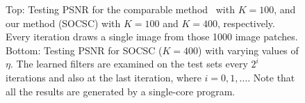 \begin{figure}[h]
\caption{Top: Testing PSNR for the comparable method~\cite{liu-2018-first} with $K=100$, and our method (SOCSC) with $K=100$ and $K=400$, respectively. Every iteration draws a single image from those 1000 image patches. Bottom: Testing PSNR for SOCSC ($K=400$) with varying values of $\eta$. The learned filters are examined on the test sets every $2^i$ iterations and also at the last iteration, where $i=0,1,\dots$. Note that all the results are generated by a single-core program.}
\label{fig:overComDicAndMinibatch}
\end{figure}




